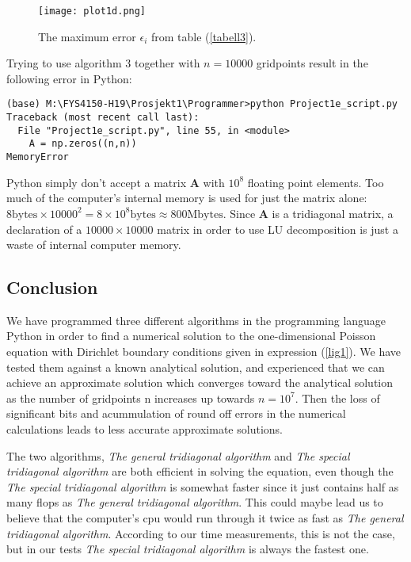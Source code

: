 \documentclass[11pt]{article}
\begin{document}
\begin{figure}[H]
\centering
\texttt{[image: plot1d.png]}

\caption{The maximum error $\epsilon_i$ from table (\ref{tabell3}).}
\label{fig:plott4}
\end{figure}

\vspace{4mm}
\noindent
Trying to use algorithm 3 together with $n=10000$ gridpoints result in the following error in
Python:

\begin{verbatim}
(base) M:\FYS4150-H19\Prosjekt1\Programmer>python Project1e_script.py
Traceback (most recent call last):
  File "Project1e_script.py", line 55, in <module>
    A = np.zeros((n,n))
MemoryError
\end{verbatim}

\noindent
Python simply don't accept a matrix $\mathbf{A}$ with $10^8$ floating point elements.
Too much of the computer's internal memory is used for just the matrix alone: 
$8\text{bytes}\times 10000^2 = 8\times 10^8\text{bytes}\approx 800 \text{Mbytes}$.
Since $\mathbf{A}$ is a tridiagonal matrix, a declaration of a $10000\times 10000$
matrix in order to use LU decomposition is just a waste of internal computer memory.


\subsection*{Conclusion}
We have programmed three different algorithms in the programming language Python
in order to find a numerical solution to the one-dimensional Poisson equation with
Dirichlet boundary conditions given in expression (\ref{lig1}). We have tested them
against a known analytical solution, and experienced that we can achieve an approximate
solution which converges toward the analytical solution as the number of gridpoints
n increases up towards $n = 10^7$. Then the loss of significant 
bits and acummulation of round off errors in the numerical calculations leads to
less accurate approximate solutions.

\vspace{5mm}
\noindent
The two algorithms, \emph{The general tridiagonal algorithm} and 
\emph{The special tridiagonal algorithm} are both efficient in solving the equation,
even though the \emph{The special tridiagonal algorithm} is somewhat faster since
it just contains half as many flops as \emph{The general tridiagonal algorithm}.
This could maybe lead us to believe that the computer's cpu would run through it 
twice as fast as \emph{The general tridiagonal algorithm}. According to our
time measurements, this is not the case, but in our tests 
\emph{The special tridiagonal algorithm} is always the fastest one.
\end{document}
